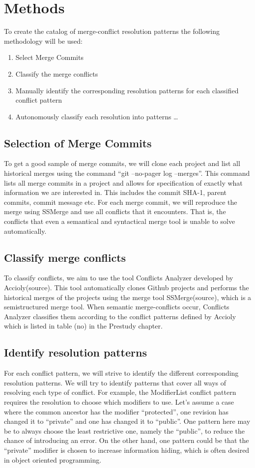 \chapter{Methods}
To create the catalog of merge-conflict resolution patterns the following methodology will be used:
\begin{enumerate}
\item Select Merge Commits
\item Classify the merge conflicts
\item Manually identify the corresponding resolution patterns for each classified conflict pattern
\item Autonomously classify each resolution into patterns \ldots
\end{enumerate}
\section{Selection of Merge Commits}
To get a good sample of merge commits, we will clone each project and list all historical merges using the command “git --no-pager log --merges”. This command lists all merge commits in a project and allows for specification of exactly what information we are interested in. This includes the commit SHA-1, parent commits, commit message etc. For each merge commit, we will reproduce the merge using SSMerge and use all conflicts that it encounters. That is, the conflicts that even a semantical and syntactical merge tool is unable to solve automatically.
\section{Classify merge conflicts}
To classify conflicts, we aim to use the tool Conflicts Analyzer developed by Accioly(source). This tool automatically clones Github projects and performs the historical merges of the projects using the merge tool SSMerge(source), which is a semistructured merge tool. When semantic merge-conflicts occur, Conflicts Analyzer classifies them according to the conflict patterns defined by Accioly which is listed in table (no) in the Prestudy chapter.
\section{Identify resolution patterns}
For each conflict pattern, we will strive to identify the different corresponding resolution patterns. We will try to identify patterns that cover all ways of resolving each type of conflict. For example, the ModifierList conflict pattern requires the resolution to choose which modifiers to use. Let's assume a case where the common ancestor has the modifier “protected”, one revision has changed it to “private” and one has changed it to “public”. One pattern here may be to always choose the least restrictive one, namely the “public”, to reduce the chance of introducing an error. On the other hand, one pattern could be that the “private” modifier is chosen to increase information hiding, which is often desired in object oriented programming.
